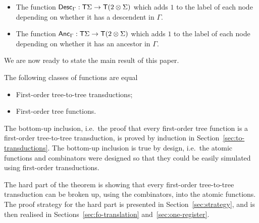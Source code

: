 \bigskip
\noindent\begin{example}
\begin{itemize}
\item The function $\mathsf{Desc}_\Gamma: \mathsf T \Sigma \to \mathsf T (2\otimes\Sigma)$ which 
adds $1$ to the label of each node depending on whether it has a descendent in $\Gamma$.
\item The function $\mathsf{Anc}_\Gamma: \mathsf T \Sigma \to \mathsf T (2\otimes\Sigma)$ which 
adds $1$ to the label of each node depending on whether it has an ancestor in $\Gamma$.
\end{itemize}
\end{example}


\bigskip
\noindent\begin{example}
\end{example}

We are now ready to state the main result of this paper. 
\begin{theorem}\label{thm:main}
    The following classes of functions are equal\begin{itemize}
        \item First-order tree-to-tree transductions;
        \item First-order tree functions.
    \end{itemize}
\end{theorem}

The bottom-up inclusion, i.e.~the proof that every first-order tree function is a first-order tree-to-tree transduction, is proved by induction in Section~\ref{sec:to-transductions}.  The bottom-up inclusion is true by design, i.e.~the atomic functions and combinators were designed so that they could be easily  simulated using first-order transductions. 

The hard part of the theorem is showing that every first-order tree-to-tree transduction can be broken up, using the combinators, into the atomic functions. The proof strategy for the hard part is presented in Section~\ref{sec:strategy}, and is then realised in Sections~\ref{sec:fo-translation} and~\ref{sec:one-register}.